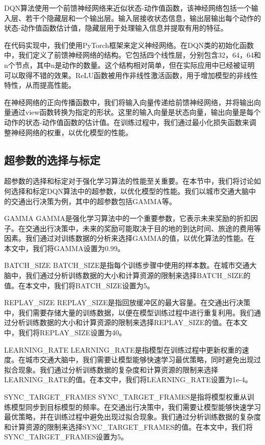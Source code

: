DQN算法使用一个前馈神经网络来近似状态-动作值函数，该神经网络包括一个输入层、若干个隐藏层和一个输出层。输入层接收状态信息，输出层输出每个动作的状态-动作值函数估计值，隐藏层用于处理输入信息并提取有用的特征。

在代码实现中，我们使用PyTorch框架来定义神经网络。在DQN类的初始化函数中，我们定义了前馈神经网络的结构。它包括四个线性层，分别包含32，64，64和n个节点，其中n是动作的数量。这个结构相对简单，但在实际应用中已经被证明可以取得不错的效果。ReLU函数被用作非线性激活函数，用于增加模型的非线性特性，从而提高性能。

在神经网络的正向传播函数中，我们将输入向量传递给前馈神经网络，并将输出向量通过view函数转换为指定的形状。这里的输入向量是状态向量，输出向量是每个动作的状态-动作值函数的估计值。在训练过程中，我们通过最小化损失函数来调整神经网络的权重，以优化模型的性能。


\subsection{超参数的选择与标定}

超参数的选择和标定对于强化学习算法的性能至关重要。在本节中，我们将讨论如何选择和标定DQN算法中的超参数，以优化模型的性能。我们以城市交通大脑中的交通出行决策为例，其中的超参数包括GAMMA等。

GAMMA
GAMMA是强化学习算法中的一个重要参数，它表示未来奖励的折扣因子。在交通出行决策中，未来的奖励可能取决于目的地的到达时间、旅途的费用等因素。我们通过对训练数据的分析来选择GAMMA的值，以优化算法的性能。在本文中，我们将GAMMA设置为0.99。

BATCH\_SIZE
BATCH\_SIZE是指每个训练步骤中使用的样本数。在城市交通大脑中，我们通过分析训练数据的大小和计算资源的限制来选择BATCH\_SIZE的值。在本文中，我们将BATCH\_SIZE设置为5。

REPLAY\_SIZE
REPLAY\_SIZE是指回放缓冲区的最大容量。在交通出行决策中，我们需要存储大量的训练数据，以便在模型训练过程中进行重复利用。我们通过分析训练数据的大小和计算资源的限制来选择REPLAY\_SIZE的值。在本文中，我们将REPLAY\_SIZE设置为40。

LEARNING\_RATE
LEARNING\_RATE是指模型在训练过程中更新权重的速度。在城市交通大脑中，我们需要让模型能够快速学习最优策略，同时避免出现过拟合现象。我们通过分析训练数据的复杂度和计算资源的限制来选择LEARNING\_RATE的值。在本文中，我们将LEARNING\_RATE设置为1e-4。

SYNC\_TARGET\_FRAMES
SYNC\_TARGET\_FRAMES是指将模型权重从训练模型同步到目标模型的频率。在交通出行决策中，我们需要让模型能够快速学习最优策略，并在训练过程中避免出现过拟合现象。我们通过分析训练数据的复杂度和计算资源的限制来选择SYNC\_TARGET\_FRAMES的值。在本文中，我们将SYNC\_TARGET\_FRAMES设置为5。

